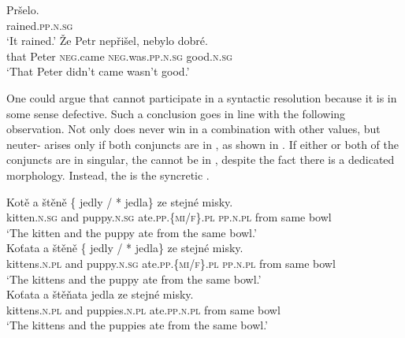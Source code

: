 \documentclass[output=paper,modfontsnewtxmath,hidelinks]{langscibook}
\begin{document}
\ea\label{def-neuter}
\ea\gll Pršelo.\\
rained.\textsc{pp.n.sg}\\
\glt `It rained.'
\ex\gll Že Petr nepřišel, nebylo dobré.\\
that Peter \textsc{neg}.came \textsc{neg}.was.\textsc{pp.n.sg} good.\textsc{n.sg}\\
\glt `That Peter didn't came wasn't good.'
\z\z

\noindent One could argue that  cannot participate in a syntactic resolution because it is in some sense defective. Such a conclusion goes in line with the following observation. Not only does  never win in a combination with other  values, but neuter- arises only if both conjuncts are in  , as shown in . If either or both of the conjuncts are in  singular, the  cannot be in  , despite the fact there is a dedicated   morphology. Instead, the  is the syncretic  . 

\ea\label{neuter}
\ea\gll Kotě a štěně \{\hspace{-2pt} jedly / *\hspace{-2pt} jedla\} ze stejné misky.\label{n-a}\\
kitten.\textsc{n.sg} and puppy.\textsc{n.sg} {} ate.\textsc{pp.\{mi/f\}.pl} {} {} \textsc{pp.n.pl} from same bowl\\
\glt `The kitten and the puppy  ate from the same bowl.'\\\hfill {}\smallskip
\ex\gll Koťata a štěně \{\hspace{-2pt} jedly / *\hspace{-2pt} jedla\} ze stejné misky.\label{n-b}\\
kittens.\textsc{n.pl} and puppy.\textsc{n.sg} {} ate.\textsc{pp.\{mi/f\}.pl} {} {} \textsc{pp.n.pl} from same bowl\\
\glt `The kittens and the puppy  ate from the same bowl.'\\\hfill {}\smallskip
\ex\gll Koťata a štěňata jedla ze stejné misky.\label{n-c}\\
kittens.\textsc{n.pl} and puppies.\textsc{n.pl} ate.\textsc{pp.n.pl} from same bowl\label{n-pl}\\
\glt `The kittens and the puppies  ate from the same bowl.'\\\hfill {}
\z\z
\end{document}
